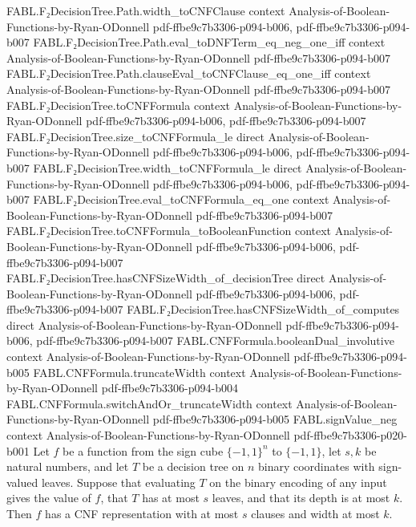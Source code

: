 \begin{theorem}
\proofstep
  {FABL.F₂DecisionTree.Path.width_toCNFClause}
  {context}
  {Analysis-of-Boolean-Functions-by-Ryan-ODonnell}
  {pdf-ffbe9c7b3306-p094-b006,
    pdf-ffbe9c7b3306-p094-b007}
\proofstep
  {FABL.F₂DecisionTree.Path.eval_toDNFTerm_eq_neg_one_iff}
  {context}
  {Analysis-of-Boolean-Functions-by-Ryan-ODonnell}
  {pdf-ffbe9c7b3306-p094-b007}
\proofstep
  {FABL.F₂DecisionTree.Path.clauseEval_toCNFClause_eq_one_iff}
  {context}
  {Analysis-of-Boolean-Functions-by-Ryan-ODonnell}
  {pdf-ffbe9c7b3306-p094-b007}
\proofstep
  {FABL.F₂DecisionTree.toCNFFormula}
  {context}
  {Analysis-of-Boolean-Functions-by-Ryan-ODonnell}
  {pdf-ffbe9c7b3306-p094-b006,
    pdf-ffbe9c7b3306-p094-b007}
\proofstep
  {FABL.F₂DecisionTree.size_toCNFFormula_le}
  {direct}
  {Analysis-of-Boolean-Functions-by-Ryan-ODonnell}
  {pdf-ffbe9c7b3306-p094-b006,
    pdf-ffbe9c7b3306-p094-b007}
\proofstep
  {FABL.F₂DecisionTree.width_toCNFFormula_le}
  {direct}
  {Analysis-of-Boolean-Functions-by-Ryan-ODonnell}
  {pdf-ffbe9c7b3306-p094-b006,
    pdf-ffbe9c7b3306-p094-b007}
\proofstep
  {FABL.F₂DecisionTree.eval_toCNFFormula_eq_one}
  {context}
  {Analysis-of-Boolean-Functions-by-Ryan-ODonnell}
  {pdf-ffbe9c7b3306-p094-b007}
\proofstep
  {FABL.F₂DecisionTree.toCNFFormula_toBooleanFunction}
  {context}
  {Analysis-of-Boolean-Functions-by-Ryan-ODonnell}
  {pdf-ffbe9c7b3306-p094-b006,
    pdf-ffbe9c7b3306-p094-b007}
\proofstep
  {FABL.F₂DecisionTree.hasCNFSizeWidth_of_decisionTree}
  {direct}
  {Analysis-of-Boolean-Functions-by-Ryan-ODonnell}
  {pdf-ffbe9c7b3306-p094-b006,
    pdf-ffbe9c7b3306-p094-b007}
\proofstep
  {FABL.F₂DecisionTree.hasCNFSizeWidth_of_computes}
  {direct}
  {Analysis-of-Boolean-Functions-by-Ryan-ODonnell}
  {pdf-ffbe9c7b3306-p094-b006,
    pdf-ffbe9c7b3306-p094-b007}
\proofstep
  {FABL.CNFFormula.booleanDual_involutive}
  {context}
  {Analysis-of-Boolean-Functions-by-Ryan-ODonnell}
  {pdf-ffbe9c7b3306-p094-b005}
\proofstep
  {FABL.CNFFormula.truncateWidth}
  {context}
  {Analysis-of-Boolean-Functions-by-Ryan-ODonnell}
  {pdf-ffbe9c7b3306-p094-b004}
\proofstep
  {FABL.CNFFormula.switchAndOr_truncateWidth}
  {context}
  {Analysis-of-Boolean-Functions-by-Ryan-ODonnell}
  {pdf-ffbe9c7b3306-p094-b005}
\proofstep
  {FABL.signValue_neg}
  {context}
  {Analysis-of-Boolean-Functions-by-Ryan-ODonnell}
  {pdf-ffbe9c7b3306-p020-b001}
Let $f$ be a function from the sign cube $\{−1,1\}^n$ to $\{−1,1\}$, let $s,k$ be
natural numbers, and let $T$ be a decision tree on $n$ binary coordinates with
sign-valued leaves. Suppose that evaluating $T$ on the binary encoding of any input
gives the value of $f$, that $T$ has at most $s$ leaves, and that its depth is at most
$k$. Then $f$ has a CNF representation with at most $s$ clauses and width at most $k$.
\end{theorem}

